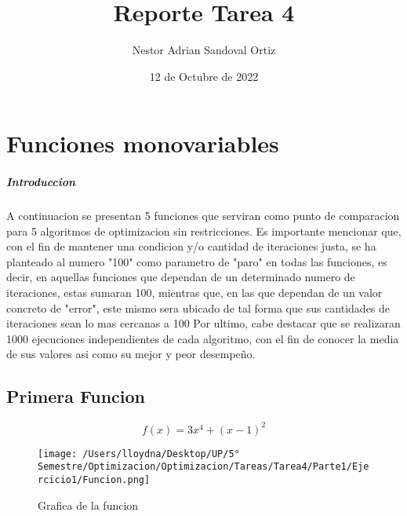 \documentclass{report}
\title{Reporte Tarea 4}
\date{12 de Octubre de 2022}
\author{Nestor Adrian Sandoval Ortiz}
\begin{document}
    \maketitle

    \chapter{Funciones monovariables}
        \paragraph{Introduccion}
        A continuacion se presentan 5 funciones que serviran como punto de comparacion para 5 algoritmos de optimizacion sin restricciones.
        Es importante mencionar que, con el fin de mantener una condicion y/o cantidad de iteraciones justa, se ha planteado al numero "100"
        como parametro de "paro" en todas las funciones, es decir, en aquellas funciones que dependan de un determinado numero de iteraciones,
        estas sumaran 100, mientras que, en las que dependan de un valor concreto de "error", este mismo sera ubicado de tal forma que sus cantidades
        de iteraciones sean lo mas cercanas a 100
        Por ultimo, cabe destacar que se realizaran 1000 ejecuciones independientes de cada algoritmo, con el fin de conocer la media de sus valores
        asi como su mejor y peor desempeño.

        \pagebreak

        \section{Primera Funcion}
            \begin{equation*}
                f(x)=3x^4+(x-1)^2
            \end{equation*}

            \begin{figure}[H]
                \texttt{[image: /Users/lloydna/Desktop/UP/5° Semestre/Optimizacion/Optimizacion/Tareas/Tarea4/Parte1/Ejercicio1/Funcion.png]}
                \caption{Grafica de la funcion}
                \label{fig:fun11}
            \end{figure}
\end{document}
